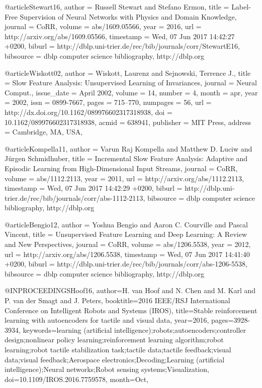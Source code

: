 @article{Stewart16,
  author    = {Russell Stewart and
               Stefano Ermon},
  title     = {Label-Free Supervision of Neural Networks with Physics and Domain
               Knowledge},
  journal   = {CoRR},
  volume    = {abs/1609.05566},
  year      = {2016},
  url       = {http://arxiv.org/abs/1609.05566},
  timestamp = {Wed, 07 Jun 2017 14:42:27 +0200},
  biburl    = {http://dblp.uni-trier.de/rec/bib/journals/corr/StewartE16},
  bibsource = {dblp computer science bibliography, http://dblp.org}
}

@article{Wiskott02,
 author = {Wiskott, Laurenz and Sejnowski, Terrence J.},
 title = {Slow Feature Analysis: Unsupervised Learning of Invariances},
 journal = {Neural Comput.},
 issue_date = {April 2002},
 volume = {14},
 number = {4},
 month = apr,
 year = {2002},
 issn = {0899-7667},
 pages = {715--770},
 numpages = {56},
 url = {http://dx.doi.org/10.1162/089976602317318938},
 doi = {10.1162/089976602317318938},
 acmid = {638941},
 publisher = {MIT Press},
 address = {Cambridge, MA, USA},
}

@article{Kompella11,
  author    = {Varun Raj Kompella and
               Matthew D. Luciw and
               J{\"{u}}rgen Schmidhuber},
  title     = {Incremental Slow Feature Analysis: Adaptive and Episodic Learning
               from High-Dimensional Input Streams},
  journal   = {CoRR},
  volume    = {abs/1112.2113},
  year      = {2011},
  url       = {http://arxiv.org/abs/1112.2113},
  timestamp = {Wed, 07 Jun 2017 14:42:29 +0200},
  biburl    = {http://dblp.uni-trier.de/rec/bib/journals/corr/abs-1112-2113},
  bibsource = {dblp computer science bibliography, http://dblp.org}
}

@article{Bengio12,
  author    = {Yoshua Bengio and
               Aaron C. Courville and
               Pascal Vincent},
  title     = {Unsupervised Feature Learning and Deep Learning: {A} Review and New
               Perspectives},
  journal   = {CoRR},
  volume    = {abs/1206.5538},
  year      = {2012},
  url       = {http://arxiv.org/abs/1206.5538},
  timestamp = {Wed, 07 Jun 2017 14:41:40 +0200},
  biburl    = {http://dblp.uni-trier.de/rec/bib/journals/corr/abs-1206-5538},
  bibsource = {dblp computer science bibliography, http://dblp.org}
}

@INPROCEEDINGS{Hoof16,
author={H. van Hoof and N. Chen and M. Karl and P. van der Smagt and J. Peters},
booktitle={2016 IEEE/RSJ International Conference on Intelligent Robots and Systems (IROS)},
title={Stable reinforcement learning with autoencoders for tactile and visual data},
year={2016},
pages={3928-3934},
keywords={learning (artificial intelligence);robots;autoencoders;controller design;nonlinear policy learning;reinforcement learning algorithm;robot learning;robot tactile stabilization task;tactile data;tactile feedback;visual data;visual feedback;Aerospace electronics;Decoding;Learning (artificial intelligence);Neural networks;Robot sensing systems;Visualization},
doi={10.1109/IROS.2016.7759578},
month={Oct},}

